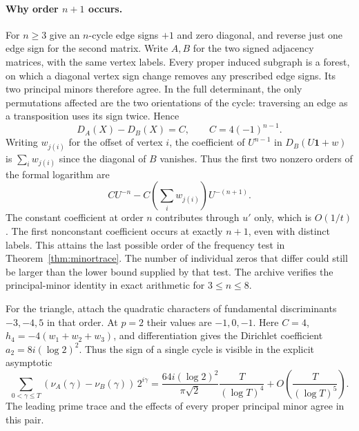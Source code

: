 \paragraph{Why order $n+1$ occurs.}
For $n\ge3$ give an $n$-cycle edge signs $+1$ and zero diagonal, and reverse just one edge sign for the second matrix. Write $A,B$ for the two signed adjacency matrices, with the same vertex labels. Every proper induced subgraph is a forest, on which a diagonal vertex sign change removes any prescribed edge signs. Its two principal minors therefore agree. In the full determinant, the only permutations affected are the two orientations of the cycle: traversing an edge as a transposition uses its sign twice. Hence
\[
 D_A(X)-D_B(X)=C,\qquad C=4(-1)^{n-1}.
\]
Writing $w_{j(i)}$ for the offset of vertex $i$, the coefficient of $U^{n-1}$ in $D_B(U\mathbf1+w)$ is $\sum_i w_{j(i)}$ since the diagonal of $B$ vanishes. Thus the first two nonzero orders of the formal logarithm are
\[
 CU^{-n}-C\left(\sum_i w_{j(i)}\right)U^{-(n+1)} .
\]
The constant coefficient at order $n$ contributes through $u'$ only, which is $O(1/t)$. The first nonconstant coefficient occurs at exactly $n+1$, even with distinct labels. This attains the last possible order of the frequency test in Theorem~\ref{thm:minortrace}. The number of individual zeros that differ could still be larger than the lower bound supplied by that test. The archive verifies the principal-minor identity in exact arithmetic for $3\le n\le8$.

For the triangle, attach the quadratic characters of fundamental discriminants $-3,-4,5$ in that order. At $p=2$ their values are $-1,0,-1$. Here $C=4$, $h_4=-4(w_1+w_2+w_3)$, and differentiation gives the Dirichlet coefficient $a_2=8i(\log 2)^2$. Thus the sign of a single cycle is visible in the explicit asymptotic
\[
 \sum_{0<\gamma\le T}(\nu_A(\gamma)-\nu_B(\gamma))\,2^{i\gamma}
 =\frac{64i(\log 2)^2}{\pi\sqrt2}\frac{T}{(\log T)^4}
   +O\!\left(\frac{T}{(\log T)^5}\right).
\]
The leading prime trace and the effects of every proper principal minor agree in this pair.
